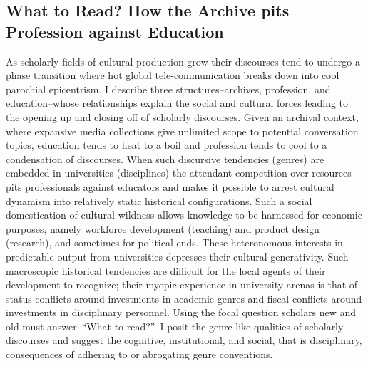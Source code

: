 \documentclass[]{book}
\theoremstyle{definition}
\theoremstyle{definition}
\theoremstyle{definition}
\theoremstyle{remark}
\begin{document}
\hypertarget{what-to-read-how-the-archive-pits-profession-against-education}{%
\subsection*{What to Read? How the Archive pits Profession against
Education}\label{what-to-read-how-the-archive-pits-profession-against-education}}




























As scholarly fields of cultural production grow their
discourses tend to undergo a phase transition where hot global
tele-communication breaks down into cool parochial epicentrism. I
describe three structures--archives, profession, and education--whose
relationships explain the social and cultural forces leading to the
opening up and closing off of scholarly discourses. Given an archival
context, where expansive media collections give unlimited scope to
potential conversation topics, education tends to heat to a boil and
profession tends to cool to a condensation of discourses. When such
discursive tendencies (genres) are embedded in universities
(disciplines) the attendant competition over resources pits
professionals against educators and makes it possible to arrest cultural
dynamism into relatively static historical configurations. Such a social
domestication of cultural wildness allows knowledge to be harnessed for
economic purposes, namely workforce development (teaching) and product
design (research), and sometimes for political ends. These heteronomous
interests in predictable output from universities depresses their
cultural generativity. Such macroscopic historical tendencies are
difficult for the local agents of their development to recognize; their
myopic experience in university arenas is that of status conflicts
around investments in academic genres and fiscal conflicts around
investments in disciplinary personnel. Using the focal question scholars
new and old must answer--``What to read?''--I posit the genre-like
qualities of scholarly discourses and suggest the cognitive,
institutional, and social, that is disciplinary, consequences of
adhering to or abrogating genre conventions.
\end{document}
